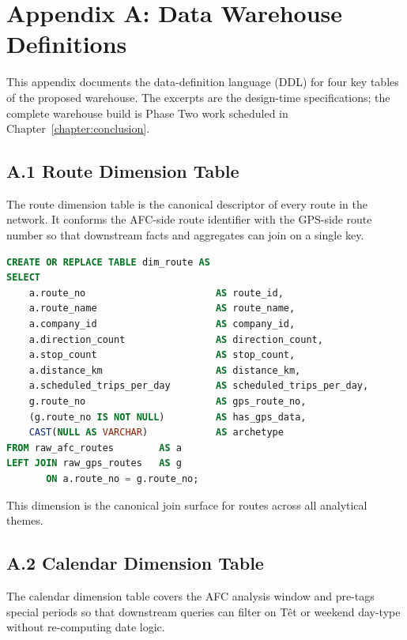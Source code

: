 \appendix

\chapter*{Appendix A: Data Warehouse Definitions}
\label{appendix:ddl}

This appendix documents the data-definition language (DDL) for four key tables of the proposed warehouse. The excerpts are the design-time specifications; the complete warehouse build is Phase Two work scheduled in Chapter~\ref{chapter:conclusion}.

\section*{A.1 Route Dimension Table}

The route dimension table is the canonical descriptor of every route in the network. It conforms the AFC-side route identifier with the GPS-side route number so that downstream facts and aggregates can join on a single key.

\begin{lstlisting}[language=SQL, basicstyle=\scriptsize\ttfamily, caption={Route dimension table.}]
CREATE OR REPLACE TABLE dim_route AS
SELECT
    a.route_no                       AS route_id,
    a.route_name                     AS route_name,
    a.company_id                     AS company_id,
    a.direction_count                AS direction_count,
    a.stop_count                     AS stop_count,
    a.distance_km                    AS distance_km,
    a.scheduled_trips_per_day        AS scheduled_trips_per_day,
    g.route_no                       AS gps_route_no,
    (g.route_no IS NOT NULL)         AS has_gps_data,
    CAST(NULL AS VARCHAR)            AS archetype
FROM raw_afc_routes        AS a
LEFT JOIN raw_gps_routes   AS g
       ON a.route_no = g.route_no;
\end{lstlisting}

\noindent This dimension is the canonical join surface for routes across all analytical themes.

\section*{A.2 Calendar Dimension Table}

The calendar dimension table covers the AFC analysis window and pre-tags special periods so that downstream queries can filter on T\^et or weekend day-type without re-computing date logic.

